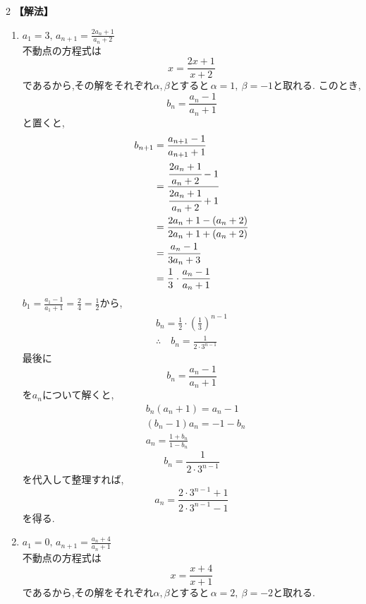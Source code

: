 \documentclass[dvipdfmx,a4paper,11pt,fleqn,openany]{jsbook}
\begin{document}
\begin{multicols*}{2}
      \noindent\textbf{【解法】}
      \begin{enumerate}[label=(\arabic*),parsep=3pt]
        \item $\displaystyle a_1=3,\, a_{n+1}=\frac{2a_n+1}{a_n+2}$\\
              不動点の方程式は
              \[
                x=\frac{2x+1}{x+2}
              \]
              であるから,その解をそれぞれ$\alpha,\beta$とすると\,$\alpha=1,\ \beta=-1$と取れる.
              このとき,
              \[
                b_n=\frac{a_n-1}{a_n+1}
              \]
              と置くと,
              \begin{align*}
                b_{n+1}&=\frac{a_{n+1}-1}{a_{n+1}+1}\\
                &=\cfrac{\cfrac{2a_n+1}{a_n+2}-1}{\cfrac{2a_n+1}{a_n+2}+1}\\
                &=\frac{2a_n+1-(a_n+2)}{2a_n+1+(a_n+2)}\\
                &=\frac{a_n-1}{3a_n+3}\\
                &=\frac{1}{3}\cdot \frac{a_n-1}{a_n+1}
              \end{align*}
              $\displaystyle b_1=\frac{a_1-1}{a_1+1}=\frac{2}{4}=\frac{1}{2}$から,
              \begin{align*}
                b_{n}=\frac{1}{2}\cdot\left(\frac{1}{3}\right)^{n-1}\\
                \therefore \quad b_n=\frac{1}{2\cdot3^{n-1}}
              \end{align*}
              最後に
              \[
                b_n=\frac{a_n-1}{a_n+1}
              \]
              を$a_n$について解くと,
              \begin{align*}
                &b_n(a_n+1)=a_n-1\\
                &(b_n-1)a_n=-1-b_n\\
                &a_n=\frac{1+b_n}{1-b_n}
              \end{align*}
              \[
                b_n=\frac{1}{2\cdot3^{n-1}}
              \]
              を代入して整理すれば,
              \[
                a_n=\frac{2\cdot3^{n-1}+1}{2\cdot3^{n-1}-1}
              \]
              を得る.
        \item $\displaystyle a_1=0,\, a_{n+1}=\frac{a_n+4}{a_n+1}$\\
              不動点の方程式は
              \[
                x=\frac{x+4}{x+1}
              \]
              であるから,その解をそれぞれ$\alpha,\beta$とすると\,$\alpha=2,\ \beta=-2$と取れる.

\end{enumerate}
\end{multicols*}
\end{document}
